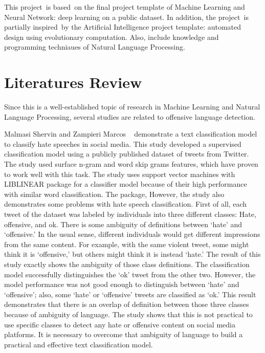 \documentclass[12pt, natbib=false]{article}
\begin{document}
This project is based on the final project template of Machine Learning and Neural Network: deep learning on a public dataset.
In addition, the project is partially inspired by the Artificial Intelligence project template: automated design using evolutionary computation.
Also, include knowledge and programming techniaues of Natural Language Processing. 

\section{Literatures Review}
Since this is a well-established topic of research in Machine Learning and Natural Language Processing, several studies are related to offensive language detection. 

Malmasi Shervin and Zampieri Marcos ~\cite{malmasi2017detecting} demonstrate a text classification model to classify hate speeches in social media. This study developed a supervised classification model using a publicly published dataset of tweets from Twitter.
The study used surface n-gram and word skip grams features, which have proven to work well with this task. The study uses support vector machines with LIBLINEAR package for a classifier model because of their high performance with similar word classification.
The package, However, the study also demonstrates some problems with hate speech classification. First of all, each tweet of the dataset was labeled by individuals into three different classes: Hate, offensive, and ok.
There is some ambiguity of definitions between ‘hate’ and ‘offensive.’ In the usual sense, different individuals would get different impressions from the same content.
For example, with the same violent tweet, some might think it is ‘offensive,’ but others might think it is instead ‘hate.’
The result of this study exactly shows the ambiguity of those class definitions. The classification model successfully distinguishes the ‘ok’ tweet from the other two. However, the model performance was not good enough to distinguish between ‘hate’ and ‘offensive’; also, some ‘hate’ or ‘offensive’ tweets are classified as ‘ok.’
This result demonstrates that there is an overlap of definition between those three classes because of ambiguity of language.
The study shows that this is not practical to use specific classes to detect any hate or offensive content on social media platforms.
It is necessary to overcome that ambiguity of language to build a practical and effective text classification model. 
\end{document}
